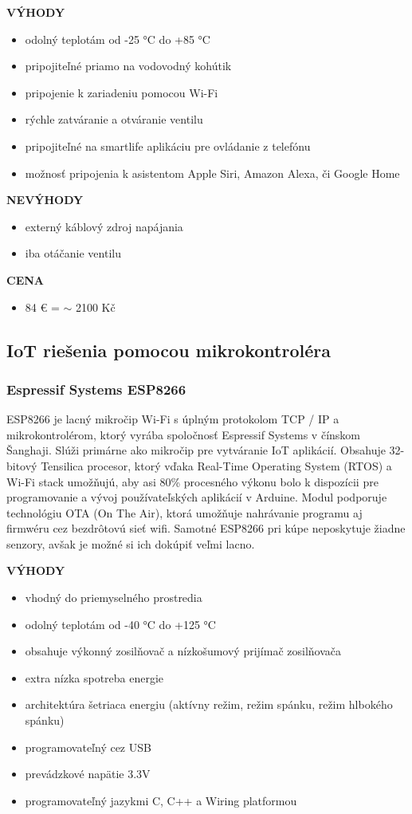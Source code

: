 \documentclass[twoside]{ctuthesis}
\theoremstyle{plain}
\theoremstyle{definition}
\theoremstyle{note}
\begin{document}
\textbf{VÝHODY}
\begin{itemize}
\item odolný teplotám od -25 °C do +85 °C
\item pripojiteľné priamo na vodovodný kohútik
\item pripojenie k zariadeniu pomocou Wi-Fi
\item rýchle zatváranie a otváranie ventilu
\item pripojiteľné na smartlife aplikáciu pre ovládanie z telefónu
\item možnosť pripojenia k asistentom Apple Siri, Amazon Alexa, či Google Home
\end{itemize}

\textbf{NEVÝHODY}
\begin{itemize}
\item externý káblový zdroj napájania
\item iba otáčanie ventilu
\end{itemize}

\textbf{CENA}
\begin{itemize}
\item 84 € = $\sim$ 2100 Kč
\end{itemize}

\subsection{IoT riešenia pomocou mikrokontroléra}

\subsubsection*{Espressif Systems ESP8266 } 
\label{sec:esp}
ESP8266 je lacný mikročip Wi-Fi s úplným protokolom TCP / IP a mikrokontrolérom, ktorý vyrába spoločnosť Espressif Systems v čínskom Šanghaji. Slúži primárne ako mikročip pre vytváranie IoT aplikácií. Obsahuje 32-bitový Tensilica procesor, ktorý vďaka Real-Time Operating System (RTOS) a Wi-Fi stack umožňujú, aby asi 80\% procesného výkonu bolo k dispozícii pre programovanie a vývoj používateľských aplikácií v Arduine. Modul podporuje technológiu OTA (On The Air), ktorá umožňuje nahrávanie programu aj firmwéru cez bezdrôtovú sieť wifi. Samotné ESP8266 pri kúpe neposkytuje žiadne senzory, avšak je možné si ich dokúpiť veľmi lacno. \cite{conclusionSolution} \cite{esp}
\newline

\textbf{VÝHODY}
\begin{itemize}
\item vhodný do priemyselného prostredia
\item odolný teplotám od -40 °C do +125 °C
\item obsahuje výkonný zosilňovač a nízkošumový prijímač zosilňovača
\item extra nízka spotreba energie
\item architektúra šetriaca energiu (aktívny režim, režim spánku, režim hlbokého spánku)
\item programovateľný cez USB
\item prevádzkové napätie 3.3V
\item programovateľný jazykmi C, C++ a Wiring platformou
\end{itemize}
\end{document}
